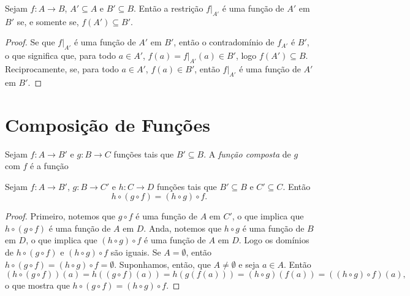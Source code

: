 \begin{prop}\label{conj:prop.func.rest.ig}
	Sejam $f: A \to B$, $A' \subseteq A$ e $B' \subseteq B$. Então a restrição $f|_{A'}$ é uma função de $A'$ em $B'$ se, e somente se, $f(A') \subseteq B'$.
\end{prop}
\begin{proof}
	Se que $f|_{A'}$ é uma função de $A'$ em $B'$, então o contradomínio de $f_{A'}$ é $B'$, o que significa que, para todo $a \in A'$, $f(a) = f|_{A'}(a) \in B'$, logo $f(A') \subseteq B$. Reciprocamente, se, para todo $a \in A'$, $f(a) \in B'$, então $f|_{A'}$ é uma função de $A'$ em $B'$.
\end{proof}

\section{Composição de Funções}

\begin{defi}
	Sejam $f: A \to B'$ e $g: B \to C$ funções tais que $B' \subseteq B$. A \emph{função composta} de $g$ com $f$ é a função 
\end{defi}

\begin{prop}
\label{prop:comp.func.asso}
	Sejam $f: A \to B'$, $g: B \to C'$ e $h: C \to D$ funções tais que $B' \subseteq B$ e $C' \subseteq C$. Então
	\begin{equation*}
	h \circ (g \circ f) = (h \circ g) \circ f.
	\end{equation*}
\end{prop}
\begin{proof}
	Primeiro, notemos que $g \circ f$ é uma função de $A$ em $C'$, o que implica que $h \circ (g \circ f)$ é uma função de $A$ em $D$. Anda, notemos que $h \circ g$ é uma função de $B$ em $D$, o que implica que $(h \circ g) \circ f$ é uma função de $A$ em $D$. Logo os domínios de $h \circ (g \circ f)$ e $(h \circ g) \circ f$ são iguais. Se $A=\emptyset$, então $h \circ (g \circ f) = (h \circ g) \circ f = \emptyset$. Suponhamos, então, que $A \neq \emptyset$ e seja $a \in A$. Então
	\begin{equation*}
	(h \circ (g \circ f))(a) = h((g \circ f)(a)) = h(g(f(a))) = (h \circ g)(f(a)) = ((h \circ g) \circ f)(a),
	\end{equation*}
o que mostra que $h \circ (g \circ f) = (h \circ g) \circ f$. 
\end{proof}

